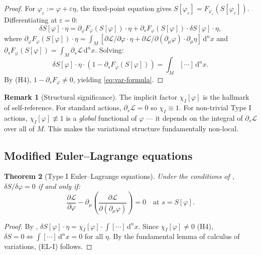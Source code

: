 \documentclass[12pt,letterpaper]{article}
\newtheorem{theorem}{Theorem}[section]
\theoremstyle{definition}
\newtheorem{remark}[theorem]{Remark}
\newcommand{\mL}{\mathcal{L}}
\newcommand{\diff}{\mathrm{d}}
\newcommand{\eps}{\varepsilon}
\newcommand{\dVol}{\,\diff^n x}
\begin{document}
\begin{proof}
For $\varphi_\eps := \varphi + \eps\eta$, the fixed-point equation gives $S[\varphi_\eps] = F_{\varphi_\eps}(S[\varphi_\eps])$. Differentiating at $\eps = 0$:
\[ \delta S[\varphi] \cdot \eta = \partial_\varphi F_\varphi(S[\varphi]) \cdot \eta + \partial_s F_\varphi(S[\varphi]) \cdot \delta S[\varphi] \cdot \eta, \]
where $\partial_\varphi F_\varphi(S[\varphi]) \cdot \eta = \int_M [\partial\mL/\partial\varphi \cdot \eta + \partial\mL/\partial(\partial_\mu\varphi) \cdot \partial_\mu\eta] \dVol$ and $\partial_s F_\varphi(S[\varphi]) = \int_M \partial_s \mL \dVol$. Solving:
\[ \delta S[\varphi] \cdot \eta \cdot (1 - \partial_s F_\varphi(S[\varphi])) = \int_M [\cdots] \dVol. \]
By (H4), $1 - \partial_s F_\varphi \neq 0$, yielding \eqref{eq:var-formula}.
\end{proof}

\begin{remark}[Structural significance]
The implicit factor $\chi_I[\varphi]$ is the hallmark of self-reference. For standard actions, $\partial_s \mL = 0$ so $\chi_I \equiv 1$. For non-trivial Type I actions, $\chi_I[\varphi] \not\equiv 1$ is a \emph{global} functional of $\varphi$ --- it depends on the integral of $\partial_s \mL$ over all of $M$. This makes the variational structure fundamentally non-local.
\end{remark}

\subsection{Modified Euler--Lagrange equations}

\begin{theorem}[Type I Euler--Lagrange equations]
\label{thm:el-I}
Under the conditions of , $\delta S / \delta \varphi = 0$ if and only if:
\begin{equation}
\frac{\partial \mL}{\partial \varphi} - \partial_\mu\!\left(\frac{\partial \mL}{\partial(\partial_\mu \varphi)}\right) = 0 \quad \text{at } s = S[\varphi].
\tag{EL-I}
\end{equation}
\end{theorem}

\begin{proof}
By , $\delta S[\varphi] \cdot \eta = \chi_I[\varphi] \cdot \int [\cdots] \dVol$. Since $\chi_I[\varphi] \neq 0$ (H4), $\delta S = 0 \iff \int [\cdots] \dVol = 0$ for all $\eta$. By the fundamental lemma of calculus of variations, (EL-I) follows.
\end{proof}
\end{document}
